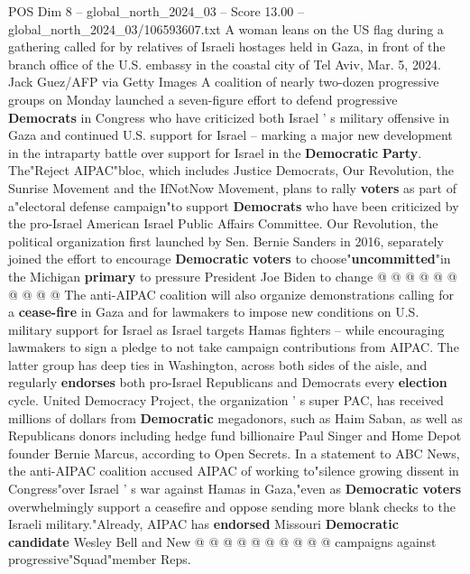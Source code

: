 \begin{textsample}{POS Dim 8 – global\_north\_2024\_03 – Score 13.00 – global\_north\_2024\_03/106593607.txt}  \label{ex:f8_pos_005}
A woman leans on the US flag during a gathering called for by relatives of Israeli hostages held in Gaza, in front of the branch office of the U.S. embassy in the coastal city of Tel Aviv, Mar. 5, 2024.
Jack Guez/AFP via Getty Images A coalition of nearly two-dozen progressive groups on Monday launched a seven-figure effort to defend progressive \textbf{Democrats} in Congress who have criticized both Israel ' s military offensive in Gaza and continued U.S. support for Israel -- marking a major new development in the intraparty battle over support for Israel in the \textbf{Democratic} \textbf{Party}.
The"Reject AIPAC"bloc, which includes Justice Democrats, Our Revolution, the Sunrise Movement and the IfNotNow Movement, plans to rally \textbf{voters} as part of a"electoral defense campaign"to support \textbf{Democrats} who have been criticized by the pro-Israel American Israel Public Affairs Committee.
Our Revolution, the political organization first launched by Sen.
Bernie Sanders in 2016, separately joined the effort to encourage \textbf{Democratic} \textbf{voters} to choose"\textbf{uncommitted}"in the Michigan \textbf{primary} to pressure President Joe Biden to change @ @ @ @ @ @ @ @ @ @ The anti-AIPAC coalition will also organize demonstrations calling for a \textbf{cease-fire} in Gaza and for lawmakers to impose new conditions on U.S. military support for Israel as Israel targets Hamas fighters -- while encouraging lawmakers to sign a pledge to not take campaign contributions from AIPAC.
The latter group has deep ties in Washington, across both sides of the aisle, and regularly \textbf{endorses} both pro-Israel Republicans and Democrats every \textbf{election} cycle.
United Democracy Project, the organization ' s super PAC, has received millions of dollars from \textbf{Democratic} megadonors, such as Haim Saban, as well as Republicans donors including hedge fund billionaire Paul Singer and Home Depot founder Bernie Marcus, according to Open Secrets.
In a statement to ABC News, the anti-AIPAC coalition accused AIPAC of working to"silence growing dissent in Congress"over Israel ' s war against Hamas in Gaza,"even as \textbf{Democratic} \textbf{voters} overwhelmingly support a ceasefire and oppose sending more blank checks to the Israeli military."Already, AIPAC has \textbf{endorsed} Missouri \textbf{Democratic} \textbf{candidate} Wesley Bell and New @ @ @ @ @ @ @ @ @ @ campaigns against progressive"Squad"member Reps.

\end{textsample}
